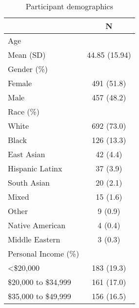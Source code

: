\documentclass[12pt]{article}
\begin{document}
\begin{table}[] \centering \caption{Participant demographics}
\begin{tabular}{@{}lc@{}}
\toprule
                        & N             \\ \midrule
Age                     &               \\
\hspace*{0.5em} Mean (SD)               & 44.85 (15.94) \\
Gender (\%)             &               \\
\hspace*{0.5em}Female                  & 491 (51.8)    \\
\hspace*{0.5em}Male                    & 457 (48.2)    \\
Race (\%)               &               \\
\hspace*{0.5em}White                   & 692 (73.0)    \\
\hspace*{0.5em}Black                   & 126 (13.3)    \\
\hspace*{0.5em}East Asian              & 42 (4.4)      \\
\hspace*{0.5em}Hispanic Latinx         & 37 (3.9)      \\
\hspace*{0.5em}South Asian             & 20 (2.1)      \\
\hspace*{0.5em}Mixed                   & 15 (1.6)      \\
\hspace*{0.5em}Other                   & 9 (0.9)       \\
\hspace*{0.5em}Native American         & 4 (0.4)       \\
\hspace*{0.5em}Middle Eastern          & 3 (0.3)       \\
Personal Income (\%)    &               \\
\hspace*{0.5em}\textless{}\$20,000     & 183 (19.3)    \\
\hspace*{0.5em}\$20,000 to \$34,999      & 161 (17.0)    \\
\hspace*{0.5em}\$35,000 to \$49,999      & 156 (16.5)    \\

\end{tabular}
\end{table}
\end{document}
